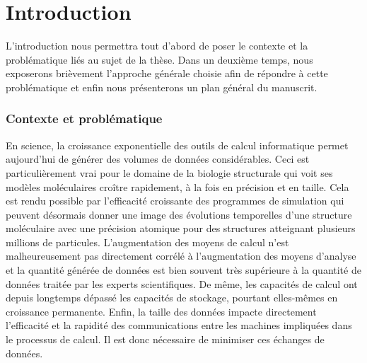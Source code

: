 
\chapter*{Introduction} %
\mtcaddchapter
{} %
\mtcaddpart
{}  %

L'introduction nous permettra tout d'abord de poser le contexte et la problématique liés au sujet de la thèse. Dans un deuxième temps, nous exposerons brièvement l'approche générale choisie afin de répondre à cette problématique et enfin nous présenterons un plan général du manuscrit.

\subsection*{Contexte et problématique}

En science, la croissance exponentielle des outils de calcul informatique permet aujourd'hui de générer des volumes de données considérables. Ceci est particulièrement vrai pour le domaine de la biologie structurale qui voit ses modèles moléculaires croître rapidement, à la fois en précision et en taille. Cela est rendu possible par l'efficacité croissante des programmes de simulation qui peuvent désormais donner une image des évolutions temporelles d'une structure moléculaire avec une précision atomique pour des structures atteignant plusieurs millions de particules. L'augmentation des moyens de calcul n'est malheureusement pas directement corrélé à l'augmentation des moyens d'analyse et la quantité générée de données est bien souvent très supérieure à la quantité de données traitée par les experts scientifiques. De même, les capacités de calcul ont depuis longtemps dépassé les capacités de stockage, pourtant elles-mêmes en croissance permanente. Enfin, la taille des données impacte directement l'efficacité et la rapidité des communications entre les machines impliquées dans le processus de calcul. Il est donc nécessaire de minimiser ces échanges de données. 

